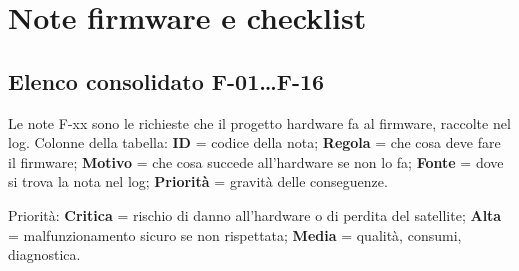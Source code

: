 \chapter{Note firmware e checklist}
\label{ch:notefw}

\section{Elenco consolidato F-01\ldots F-16}
Le note F-xx sono le richieste che il progetto hardware fa al firmware, raccolte nel log. Colonne della tabella: \textbf{ID} = codice della nota; \textbf{Regola} = che cosa deve fare il firmware; \textbf{Motivo} = che cosa succede all'hardware se non lo fa; \textbf{Fonte} = dove si trova la nota nel log; \textbf{Priorità} = gravità delle conseguenze.

Priorità: \textbf{\textcolor{sbred}{Critica}} = rischio di danno all'hardware o di perdita del satellite; \textbf{\textcolor{sborange}{Alta}} = malfunzionamento sicuro se non rispettata; \textbf{\textcolor{sbgreen}{Media}} = qualità, consumi, diagnostica.

